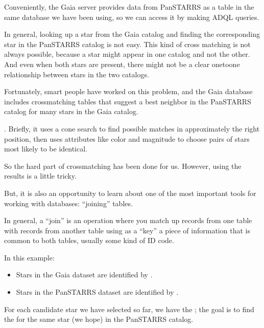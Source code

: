 \documentclass[letterpaper,10pt,english]{sphinxmanual}
\begin{document}
Conveniently, the Gaia server provides data from Pan\sphinxhyphen{}STARRS as a table in the same database we have been using, so we can access it by making ADQL queries.

In general, looking up a star from the Gaia catalog and finding the corresponding star in the Pan\sphinxhyphen{}STARRS catalog is not easy.  This kind of cross matching is not always possible, because a star might appear in one catalog and not the other.  And even when both stars are present, there might not be a clear one\sphinxhyphen{}to\sphinxhyphen{}one relationship between stars in the two catalogs.

Fortunately, smart people have worked on this problem, and the Gaia database includes cross\sphinxhyphen{}matching tables that suggest a best neighbor in the Pan\sphinxhyphen{}STARRS catalog for many stars in the Gaia catalog.

.  Briefly, it uses a cone search to find possible matches in approximately the right position, then uses attributes like color and magnitude to choose pairs of stars most likely to be identical.

So the hard part of cross\sphinxhyphen{}matching has been done for us.  However, using the results is a little tricky.

But, it is also an opportunity to learn about one of the most important tools for working with databases: “joining” tables.

In general, a “join” is an operation where you match up records from one table with records from another table using as a “key” a piece of information that is common to both tables, usually some kind of ID code.

In this example:
\begin{itemize}
\item {} 
Stars in the Gaia dataset are identified by .

\item {} 
Stars in the Pan\sphinxhyphen{}STARRS dataset are identified by .

\end{itemize}

For each candidate star we have selected so far, we have the ; the goal is to find the  for the same star (we hope) in the Pan\sphinxhyphen{}STARRS catalog.
\end{document}
